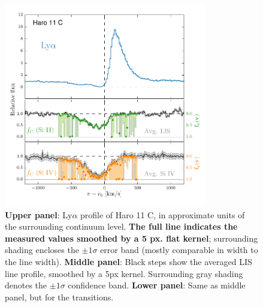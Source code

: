 \documentclass[twocolumn, trackchanges]{aastex61}
\begin{document}
\begin{figure}
\centering
\includegraphics[width=3.500in]{./LyACoverfracs.pdf}
\caption{\textbf{Upper panel}: Ly$\alpha$ profile of Haro 11 C, in
approximate units of the surrounding continuum level. \textbf{The full line
indicates the measured values smoothed by a 5 px. flat kernel}; surrounding shading
encloses the $\pm 1 \sigma$ error band (mostly comparable in width to
the line width). \textbf{Middle panel}: Black steps show the averaged
LIS line profile, smoothed by a 5px kernel. Surrounding gray shading
denotes the $\pm 1 \sigma$ confidence band. \textbf{Lower panel}: Same
as middle panel, but for the  transitions.
}\label{fig:HisLisLya}
\end{figure}
\end{document}

